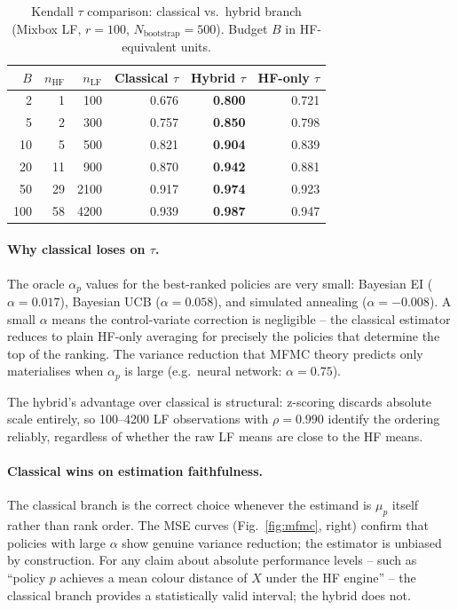 \documentclass[twoside,twocolumn,9pt]{article}
\begin{document}
\begin{table}[h]
\centering
\caption{Kendall $\tau$ comparison: classical vs.\ hybrid branch (Mixbox LF, $r=100$, $N_\mathrm{bootstrap}=500$). Budget $B$ in HF-equivalent units.}
\label{tab:mfmc_compare}
\begin{tabular}{rrrrrr}
\hline
$B$ & $n_\mathrm{HF}$ & $n_\mathrm{LF}$ & Classical $\tau$ & Hybrid $\tau$ & HF-only $\tau$ \\
\hline
2 & 1 & 100 & 0.676 & \textbf{0.800} & 0.721 \\
5 & 2 & 300 & 0.757 & \textbf{0.850} & 0.798 \\
10 & 5 & 500 & 0.821 & \textbf{0.904} & 0.839 \\
20 & 11 & 900 & 0.870 & \textbf{0.942} & 0.881 \\
50 & 29 & 2100 & 0.917 & \textbf{0.974} & 0.923 \\
100 & 58 & 4200 & 0.939 & \textbf{0.987} & 0.947 \\
\hline
\end{tabular}
\end{table}

\paragraph{Why classical loses on $\tau$.}
The oracle $\alpha_p$ values for the best-ranked policies are very small: Bayesian EI ($\alpha = 0.017$), Bayesian UCB ($\alpha = 0.058$), and simulated annealing ($\alpha = -0.008$).  A small $\alpha$ means the control-variate correction is negligible -- the classical estimator reduces to plain HF-only averaging for precisely the policies that determine the top of the ranking.  The variance reduction that MFMC theory predicts only materialises when $\alpha_p$ is large (e.g.\ neural network: $\alpha = 0.75$).

The hybrid's advantage over classical is structural: z-scoring discards absolute scale entirely, so 100--4200 LF observations with $\rho = 0.990$ identify the ordering reliably, regardless of whether the raw LF means are close to the HF means.

\paragraph{Classical wins on estimation faithfulness.}
The classical branch is the correct choice whenever the estimand is $\mu_p$ itself rather than rank order.  The MSE curves (Fig.~\ref{fig:mfmc}, right) confirm that policies with large $\alpha$ show genuine variance reduction; the estimator is unbiased by construction.  For any claim about absolute performance levels -- such as ``policy $p$ achieves a mean colour distance of $X$ under the HF engine'' -- the classical branch provides a statistically valid interval; the hybrid does not.
\end{document}
